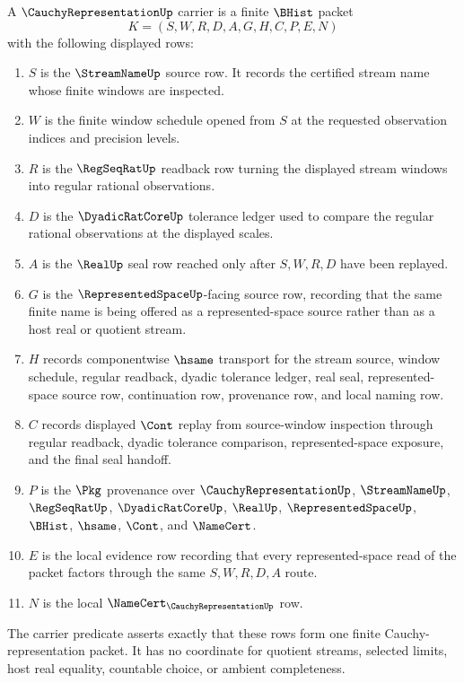 \begin{definition}
\label{def:cauchy-representation-carrier}
A $\CauchyRepresentationUp$ carrier is a finite $\BHist$ packet
$$
K=(S,W,R,D,A,G,H,C,P,E,N)
$$
with the following displayed rows:
\begin{enumerate}
\item $S$ is the $\StreamNameUp$ source row. It records the certified stream name whose finite windows are inspected.
\item $W$ is the finite window schedule opened from $S$ at the requested observation indices and precision levels.
\item $R$ is the $\RegSeqRatUp$ readback row turning the displayed stream windows into regular rational observations.
\item $D$ is the $\DyadicRatCoreUp$ tolerance ledger used to compare the regular rational observations at the displayed scales.
\item $A$ is the $\RealUp$ seal row reached only after $S,W,R,D$ have been replayed.
\item $G$ is the $\RepresentedSpaceUp$-facing source row, recording that the same finite name is being offered as a represented-space source rather than as a host real or quotient stream.
\item $H$ records componentwise $\hsame$ transport for the stream source, window schedule, regular readback, dyadic tolerance ledger, real seal, represented-space source row, continuation row, provenance row, and local naming row.
\item $C$ records displayed $\Cont$ replay from source-window inspection through regular readback, dyadic tolerance comparison, represented-space exposure, and the final seal handoff.
\item $P$ is the $\Pkg$ provenance over $\CauchyRepresentationUp$, $\StreamNameUp$, $\RegSeqRatUp$, $\DyadicRatCoreUp$, $\RealUp$, $\RepresentedSpaceUp$, $\BHist$, $\hsame$, $\Cont$, and $\NameCert$.
\item $E$ is the local evidence row recording that every represented-space read of the packet factors through the same $S,W,R,D,A$ route.
\item $N$ is the local $\NameCert_{\CauchyRepresentationUp}$ row.
\end{enumerate}
The carrier predicate asserts exactly that these rows form one finite Cauchy-representation packet. It has no coordinate for quotient streams, selected limits, host real equality, countable choice, or ambient completeness.
\end{definition}

